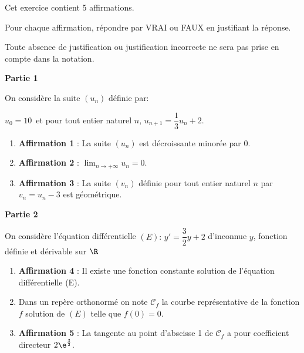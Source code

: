 \medskip

Cet exercice contient 5 affirmations.

Pour chaque affirmation, répondre par VRAI ou FAUX en justifiant la réponse.

Toute absence de justification ou justification incorrecte ne sera pas prise en compte dans la notation.

\medskip

\textbf{Partie 1}

\medskip

On considère la suite $(u_n)$ définie par:

\begin{center}$u_0 = 10$\, et pour tout entier naturel $n,\,u_{n+1} = \dfrac13 u_n + 2$.\end{center}

\medskip

\begin{enumerate}
\item \textbf{Affirmation 1} : La suite $(u_n)$ est décroissante minorée par 0.
\item \textbf{Affirmation 2} : $\displaystyle\lim_{n \to + \infty} u_n = 0$.
\item \textbf{Affirmation 3} : La suite $(v_n)$ définie pour tout entier naturel $n$ par $v_n = u_n - 3$ est géométrique.
\end{enumerate}

\medskip

\textbf{Partie 2}

\medskip

On considère l'équation différentielle $(E) :\, y' = \dfrac32 y + 2$ d'inconnue $y$, fonction définie et 
dérivable sur $\R$

\medskip

\begin{enumerate}
\item \textbf{Affirmation 4} : Il existe une fonction constante solution de l'équation différentielle (E).
\item Dans un repère orthonormé \Oij{} on note $\mathcal{C}_f$ la courbe représentative de la fonction $f$ solution de $(E)$ telle  que $f(0) = 0$.

\item \textbf{Affirmation 5} : La tangente au point d'abscisse 1 de $\mathcal{C}_f$ a pour coefficient directeur $2 \e^{\frac32}$.
\end{enumerate}

\bigskip
